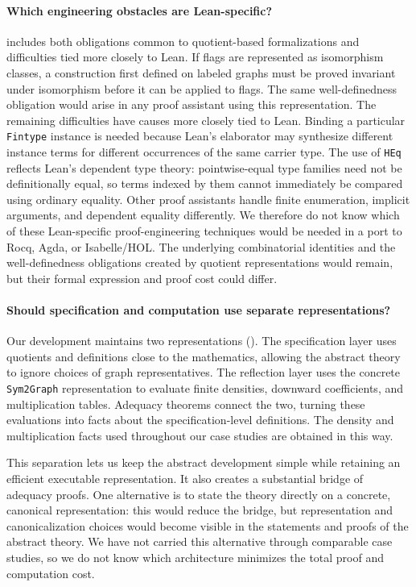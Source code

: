 \documentclass{article}
\newcommand{\lean}[1]{\texttt{#1}}
\begin{document}
\paragraph{Which engineering obstacles are Lean-specific?}
 includes both obligations common to quotient-based
formalizations and difficulties tied more closely to Lean.  If flags are
represented as isomorphism classes, a construction first defined on labeled
graphs must be proved invariant under isomorphism before it can be applied to
flags.  The same well-definedness obligation would arise in any proof
assistant using this representation.  The remaining difficulties have causes
more closely tied to Lean.  Binding a particular \lean{Fintype}
instance is needed because Lean's elaborator may synthesize different instance
terms for different occurrences of the same carrier type.  The use of
\lean{HEq} reflects Lean's dependent type theory: pointwise-equal type families
need not be definitionally equal, so terms indexed by them cannot immediately
be compared using ordinary equality.
Other proof assistants handle finite enumeration, implicit arguments, and
dependent equality differently.  We therefore do not know which of these
Lean-specific proof-engineering techniques would be needed in a port to Rocq,
Agda, or Isabelle/HOL\@.  The underlying combinatorial identities and the
well-definedness obligations created by quotient representations would remain,
but their formal expression and proof cost could differ.

\paragraph{Should specification and computation use separate representations?}
Our development maintains two representations
().  The specification layer uses
quotients and definitions close to the mathematics, allowing the abstract
theory to ignore choices of graph representatives.  The reflection layer uses
the concrete \lean{Sym2Graph} representation to evaluate finite densities,
downward coefficients, and multiplication tables.  Adequacy theorems connect
the two, turning these evaluations into facts about the specification-level
definitions.  The density and multiplication facts used throughout our case
studies are obtained in this way.

This separation lets us keep the abstract development simple while retaining
an efficient executable representation.  It also creates a substantial
bridge of adequacy proofs.  One alternative is to state the theory directly
on a concrete, canonical representation: this would reduce the bridge, but
representation and canonicalization choices would become visible in the
statements and proofs of the abstract theory.  We have not carried this
alternative through comparable case studies, so we do not know which
architecture minimizes the total proof and computation cost.
\end{document}
